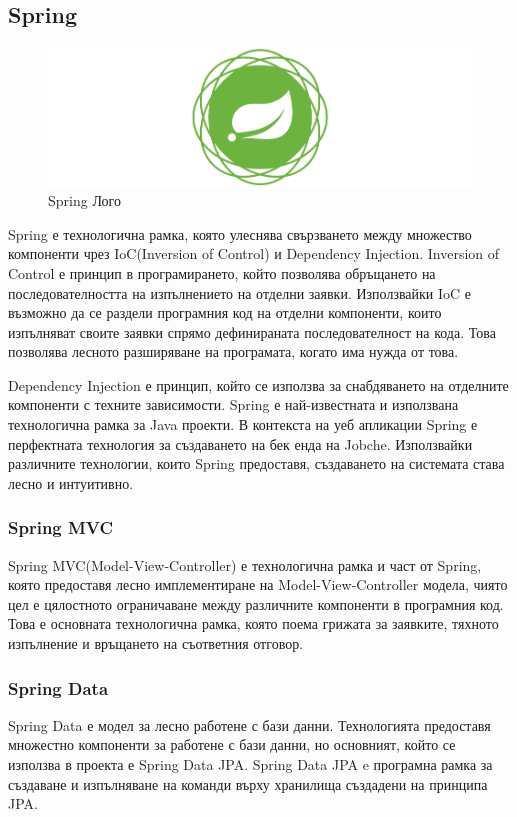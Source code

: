     \subsection{Spring}
    
    \begin{figure}[h]
        \centering
        \includegraphics[scale=0.5]{images/spring-framework.png}
        \caption{Spring Лого}
        \label{fig:intellij_logo}
    \end{figure}
    Spring е технологична рамка, която улеснява свързването между множество компоненти чрез IoC(Inversion of Control) и Dependency Injection. Inversion of Control е принцип в програмирането, който позволява обръщането на последователността на изпълнението на отделни заявки. Използвайки IoC е възможно да се раздели програмния код на отделни компоненти, които изпълняват своите заявки спрямо дефинираната последователност на кода. Това позволява лесното разширяване на програмата, когато има нужда от това. 
    
    Dependency Injection е принцип, който се използва за снабдяването на отделните компоненти с техните зависимости. Spring е най-известната и използвана технологична рамка за Java проекти. В контекста на уеб апликации Spring е перфектната технология за създаването на бек енда на Jobche. Използвайки различните технологии, които Spring предоставя, създаването на системата става лесно и интуитивно.
    
        \subsubsection{Spring MVC}
            Spring MVC(Model-View-Controller) е технологична рамка и част от Spring, която предоставя лесно имплементиране на Model-View-Controller модела, чиято цел е цялостното ограничаване между различните компоненти в програмния код. Това е основната технологична рамка, която поема грижата за заявките, тяхното изпълнение и връщането на съответния отговор.
        
        \subsubsection{Spring Data}
            Spring Data е модел за лесно работене с бази данни. Технологията предоставя множестно компоненти за работене с бази данни, но основният, който се използва в проекта е Spring Data JPA. Spring Data JPA e програмна рамка за създаване и изпълняване на команди върху хранилища създадени на принципа JPA.
        
